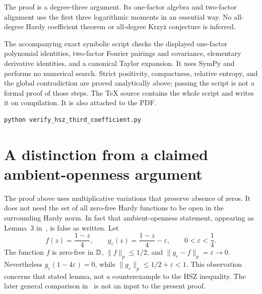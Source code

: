 The proof is a degree-three argument. Its one-factor algebra and
two-factor alignment use the first three logarithmic moments in an
essential way. No all-degree Hardy coefficient theorem or all-degree
Krzy\.{z} conjecture is inferred.

The accompanying exact symbolic script checks the displayed one-factor
polynomial identities, two-factor Fourier pairings and covariance,
elementary derivative identities, and a canonical Taylor expansion.
It uses SymPy and performs no numerical search. Strict positivity,
compactness, relative entropy, and the global contradiction are proved
analytically above; passing the script is not a formal proof of those
steps. The TeX source contains the whole script and writes it on
compilation. It is also attached to the PDF.
\begin{lstlisting}
python verify_hsz_third_coefficient.py
\end{lstlisting}

\appendix
\section{A distinction from a claimed ambient-openness argument}
The proof above uses multiplicative variations that preserve absence of
zeros. It does not need the set of all zero-free Hardy functions to be
open in the surrounding Hardy norm. In fact that ambient-openness
statement, appearing as Lemma~3 in~\cite{Krushkal2022}, is false as written.
Let
\[
 f(z)=\frac{1-z}{4},\qquad
 g_\varepsilon(z)=\frac{1-z}{4}-\varepsilon,
 \qquad 0<\varepsilon<\frac14.
\]
The function $f$ is zero-free in $\mathbb D$, $\|f\|_p\le1/2$, and
$\|g_\varepsilon-f\|_p=\varepsilon\to0$. Nevertheless
$g_\varepsilon(1-4\varepsilon)=0$, while
$\|g_\varepsilon\|_p\le1/2+\varepsilon<1$.
This observation concerns that stated lemma, not a counterexample to
the HSZ inequality. The later general comparison in~\cite{Krushkal2026}
is not an input to the present proof.

